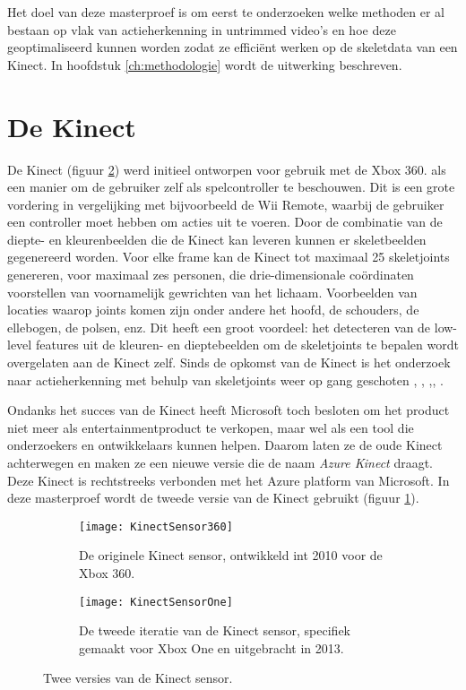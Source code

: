 Het doel van deze masterproef is om eerst te onderzoeken welke methoden er al bestaan op vlak van actieherkenning in untrimmed video's en hoe deze geoptimaliseerd kunnen worden zodat ze efficiënt werken op de skeletdata van een Kinect. In hoofdstuk \ref{ch:methodologie} wordt de uitwerking beschreven.


\section{De Kinect}
De Kinect (figuur \ref{fig:KinectSensorVersies}) werd initieel ontworpen voor gebruik met de Xbox 360.  als een manier om de gebruiker zelf als spelcontroller te beschouwen. Dit is een grote vordering in vergelijking met bijvoorbeeld de Wii Remote, waarbij de gebruiker een controller moet hebben om acties uit te voeren. Door de combinatie van de diepte- en kleurenbeelden die de Kinect kan leveren kunnen er skeletbeelden gegenereerd worden. Voor elke frame kan de Kinect tot maximaal 25 skeletjoints genereren, voor maximaal zes personen, die drie-dimensionale coördinaten voorstellen van voornamelijk gewrichten van het lichaam. Voorbeelden van locaties waarop joints komen zijn onder andere het hoofd, de schouders, de ellebogen, de polsen, enz. Dit heeft een groot voordeel: het detecteren van de low-level features uit de kleuren- en dieptebeelden om de skeletjoints te bepalen wordt overgelaten aan de Kinect zelf. Sinds de opkomst van de Kinect is het onderzoek naar actieherkenning met behulp van skeletjoints weer op gang geschoten \cite{Deboeverie2016}, \cite{Xia2012}, \cite{Wang2014},\cite{Vemulapalli2014}, \cite{Li2018}.

Ondanks het succes van de Kinect heeft Microsoft toch besloten om het product niet meer als entertainmentproduct te verkopen, maar wel als een tool die onderzoekers en ontwikkelaars kunnen helpen. Daarom laten ze de oude Kinect achterwegen en maken ze een nieuwe versie  die de  naam \textit{Azure Kinect} draagt. Deze Kinect is rechtstreeks verbonden met het Azure platform van Microsoft. In deze masterproef wordt de tweede versie van de Kinect gebruikt (figuur \ref{fig:KinectSensorOne}).

\begin{figure}
	\begin{subfigure}[t]{0.48\textwidth}
		\texttt{[image: KinectSensor360]}
		\caption{De originele Kinect sensor, ontwikkeld int 2010 voor de Xbox 360.}
	\end{subfigure}
	\begin{subfigure}[t]{0.48\textwidth}
		\texttt{[image: KinectSensorOne]}
		\caption{De tweede iteratie van de Kinect sensor, specifiek gemaakt voor Xbox One en uitgebracht in 2013.}
		\label{fig:KinectSensorOne}
	\end{subfigure}
	\caption{Twee versies van de Kinect sensor.}
	\label{fig:KinectSensorVersies}
\end{figure}

